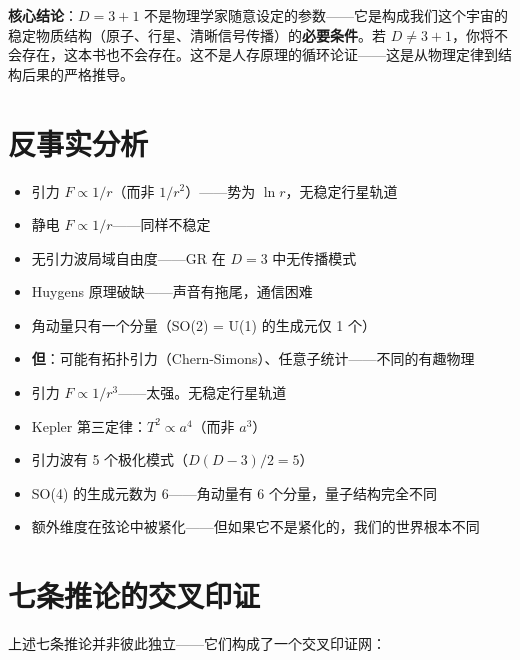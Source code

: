 \textbf{核心结论}：$D=3+1$ 不是物理学家随意设定的参数——它是构成我们这个宇宙的稳定物质结构（原子、行星、清晰信号传播）的\textbf{必要条件}。若 $D \neq 3+1$，你将不会存在，这本书也不会存在。这不是人存原理的循环论证——这是从物理定律到结构后果的严格推导。

\section*{反事实分析}

\begin{limitbox}[若 $D=2+1$（两个空间维 + 一个时间维）]
  \begin{itemize}
    \item 引力 $F \propto 1/r$（而非 $1/r^2$）——势为 $\ln r$，无稳定行星轨道
    \item 静电 $F \propto 1/r$——同样不稳定
    \item 无引力波局域自由度——GR 在 $D=3$ 中无传播模式
    \item Huygens 原理破缺——声音有拖尾，通信困难
    \item 角动量只有一个分量（SO(2) = U(1) 的生成元仅 1 个）
    \item \textbf{但}：可能有拓扑引力（Chern-Simons）、任意子统计——不同的有趣物理
  \end{itemize}
\end{limitbox}

\begin{limitbox}[若 $D=4+1$（四个空间维 + 一个时间维）]
  \begin{itemize}
    \item 引力 $F \propto 1/r^3$——太强。无稳定行星轨道
    \item Kepler 第三定律：$T^2 \propto a^4$（而非 $a^3$）
    \item 引力波有 5 个极化模式（$D(D-3)/2 = 5$）
    \item SO(4) 的生成元数为 6——角动量有 6 个分量，量子结构完全不同
    \item 额外维度在弦论中被紧化——但如果它不是紧化的，我们的世界根本不同
  \end{itemize}
\end{limitbox}

\section{七条推论的交叉印证}

上述七条推论并非彼此独立——它们构成了一个交叉印证网：

